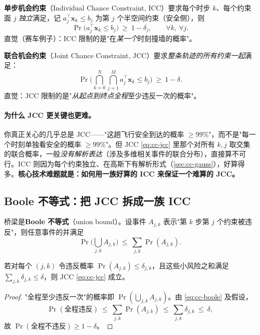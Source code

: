 \begin{definition}\label{def:cc-icc}
\textbf{单步机会约束}（Individual Chance Constraint, ICC）要求每个时步 $k$、每个约束面 $j$ \emph{独立}满足，记 $a_j^\top\mathbf{x}_k\le b_j$ 为第 $j$ 个半空间约束（安全侧），则
\begin{equation}
  \Pr\big(a_j^\top\mathbf{x}_k\le b_j\big)\ \ge\ 1-\delta_j,\qquad \forall k,\ \forall j.
  \label{eq:cc-icc}
\end{equation}
直觉（赛车例子）：ICC 限制的是"在\emph{某一个}时刻撞墙的概率"。
\end{definition}

\begin{definition}\label{def:cc-jcc}
\textbf{联合机会约束}（Joint Chance Constraint, JCC）要求\emph{整条轨迹的所有约束一起}满足：
\begin{equation}
  \Pr\Big(\bigcap_{k=0}^{N}\bigcap_{j=1}^{M} a_j^\top\mathbf{x}_k\le b_j\Big)\ \ge\ 1-\delta.
  \label{eq:cc-jcc}
\end{equation}
直觉：JCC 限制的是"\emph{从起点到终点全程}至少违反一次的概率"。
\end{definition}

\paragraph{为什么 JCC 更关键也更难。}
你真正关心的几乎总是 JCC——"这趟飞行安全到达的概率 $\ge99\%$"，而不是"每一个时刻单独看安全的概率 $\ge99\%$"。但 JCC \cref{eq:cc-jcc} 里那个对所有 $k,j$ 取交集的联合概率，一般\emph{没有解析表达}（涉及多维相关事件的联合分布），直接算不可行。ICC 则因为每个约束独立、在高斯下有解析形式（\cref{sec:cc-gauss}），好算得多。\textbf{核心技术难题就是：如何用一族好算的 ICC 来保证一个难算的 JCC。}

\subsection{Boole 不等式：把 JCC 拆成一族 ICC}
\label{sec:cc-boole}

桥梁是\textbf{Boole 不等式}（union bound）。设事件 $A_{j,k}$ 表示"第 $k$ 步第 $j$ 个约束被违反"，则任意事件的并满足
\begin{equation}
  \Pr\Big(\bigcup_{j,k} A_{j,k}\Big)\ \le\ \sum_{j,k}\Pr(A_{j,k}).
  \label{eq:cc-boole}
\end{equation}

\begin{theorem}\label{thm:cc-boole}
若对每个 $(j,k)$ 令违反概率 $\Pr(A_{j,k})\le\delta_{j,k}$，且这些小风险之和满足 $\sum_{j,k}\delta_{j,k}\le\delta$，则 JCC \cref{eq:cc-jcc} 成立。
\end{theorem}
\begin{proof}
"全程至少违反一次"的概率即 $\Pr(\bigcup_{j,k}A_{j,k})$。由 \cref{eq:cc-boole} 及假设，
\[
  \Pr(\text{全程违反})\ \le\ \sum_{j,k}\Pr(A_{j,k})\ \le\ \sum_{j,k}\delta_{j,k}\ \le\ \delta,
\]
故 $\Pr(\text{全程不违反})\ge 1-\delta$。
\end{proof}

